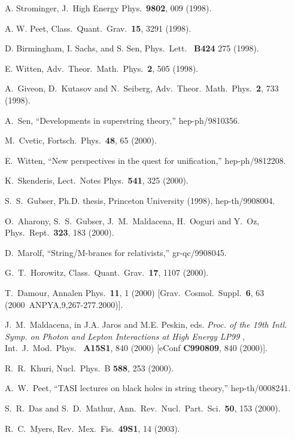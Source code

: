 \documentclass[12pt]{article} \usepackage{latexsym} \textwidth 15cm
\begin{document}
\begin{thebibliography}{99}
 A. Strominger, J.\ High Energy Phys.\ {\bf 9802}, 009
  (1998).

 A. W. Peet, Class.\ Quant.\ Grav.\ {\bf 15}, 3291
  (1998).

 D. Birmingham, I. Sachs, and S. Sen, Phys.\ Lett.\ {\bf
  B424} 275 (1998).

 E. Witten, Adv.\ Theor.\ Math.\ Phys.\ {\bf 2}, 505
  (1998).
  
 A.~Giveon, D.~Kutasov and N.~Seiberg, Adv.\ Theor.\
  Math.\ Phys.\  {\bf 2}, 733 (1998).
  
 A.~Sen, ``Developments in superstring theory,''
  hep-ph/9810356.
  
 M.~Cvetic, Fortsch.\ Phys.\  {\bf 48}, 65 (2000).

 E.~Witten, ``New perspectives in the quest for
  unification,'' hep-ph/9812208.

 K.~Skenderis, Lect.\ Notes Phys.\  {\bf 541},
  325 (2000).
  
 S.~S.~Gubser, Ph.D. thesis, Princeton University
  (1998), hep-th/9908004.
  
 O.~Aharony, S.~S.~Gubser, J.~M.~Maldacena, H.~Ooguri
  and Y.~Oz, Phys.\ Rept.\  {\bf 323}, 183 (2000).
  
 D.~Marolf, ``String/M-branes for relativists,''
  gr-qc/9908045.
  
 G.~T.~Horowitz, Class.\ Quant.\ Grav.\  {\bf 17},
  1107 (2000).
  
 T.~Damour, Annalen Phys.\  {\bf 11}, 1 (2000)
  [Grav.\ Cosmol.\ Suppl.\  {\bf 6}, 63 (2000\ ANPYA,9,267-277.2000)].

 J.~M.~Maldacena, in J.A. Jaros and M.E. Peskin,
eds. {\it Proc. of the 19th Intl. Symp. on Photon and Lepton
Interactions at High Energy LP99 }, Int.\ J.\ Mod.\ Phys.\ {\bf
A15S1}, 840 (2000) [eConf {\bf C990809}, 840 (2000)].

 R.~R.~Khuri, Nucl.\ Phys.\ B {\bf 588}, 253 (2000).

 A.~W.~Peet, ``TASI lectures on black holes in string
  theory,'' hep-th/0008241.

 S.~R.~Das and S.~D.~Mathur, Ann.\ Rev.\ Nucl.\ Part.\
  Sci.\  {\bf 50}, 153 (2000).
  
 R.~C.~Myers, Rev.\ Mex.\ Fis.\  {\bf 49S1}, 14 (2003).


\end{thebibliography}
\end{document}

